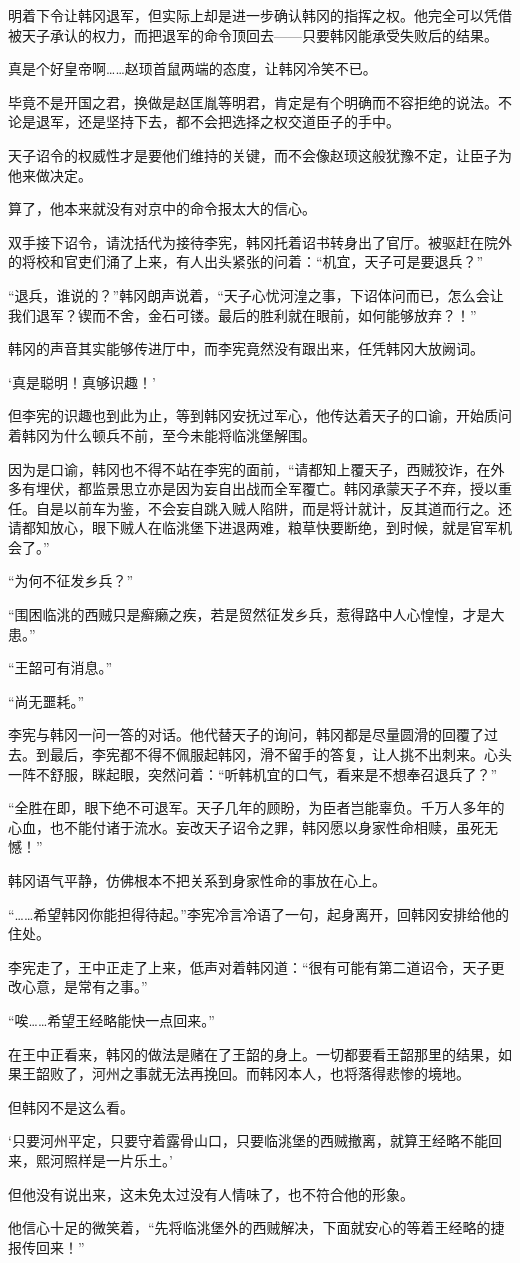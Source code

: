 明着下令让韩冈退军，但实际上却是进一步确认韩冈的指挥之权。他完全可以凭借被天子承认的权力，而把退军的命令顶回去——只要韩冈能承受失败后的结果。

真是个好皇帝啊……赵顼首鼠两端的态度，让韩冈冷笑不已。

毕竟不是开国之君，换做是赵匡胤等明君，肯定是有个明确而不容拒绝的说法。不论是退军，还是坚持下去，都不会把选择之权交道臣子的手中。

天子诏令的权威性才是要他们维持的关键，而不会像赵顼这般犹豫不定，让臣子为他来做决定。

算了，他本来就没有对京中的命令报太大的信心。

双手接下诏令，请沈括代为接待李宪，韩冈托着诏书转身出了官厅。被驱赶在院外的将校和官吏们涌了上来，有人出头紧张的问着：“机宜，天子可是要退兵？”

“退兵，谁说的？”韩冈朗声说着，“天子心忧河湟之事，下诏体问而已，怎么会让我们退军？锲而不舍，金石可镂。最后的胜利就在眼前，如何能够放弃？！”

韩冈的声音其实能够传进厅中，而李宪竟然没有跟出来，任凭韩冈大放阙词。

‘真是聪明！真够识趣！’

但李宪的识趣也到此为止，等到韩冈安抚过军心，他传达着天子的口谕，开始质问着韩冈为什么顿兵不前，至今未能将临洮堡解围。

因为是口谕，韩冈也不得不站在李宪的面前，“请都知上覆天子，西贼狡诈，在外多有埋伏，都监景思立亦是因为妄自出战而全军覆亡。韩冈承蒙天子不弃，授以重任。自是以前车为鉴，不会妄自跳入贼人陷阱，而是将计就计，反其道而行之。还请都知放心，眼下贼人在临洮堡下进退两难，粮草快要断绝，到时候，就是官军机会了。”

“为何不征发乡兵？”

“围困临洮的西贼只是癣癞之疾，若是贸然征发乡兵，惹得路中人心惶惶，才是大患。”

“王韶可有消息。”

“尚无噩耗。”

李宪与韩冈一问一答的对话。他代替天子的询问，韩冈都是尽量圆滑的回覆了过去。到最后，李宪都不得不佩服起韩冈，滑不留手的答复，让人挑不出刺来。心头一阵不舒服，眯起眼，突然问着：“听韩机宜的口气，看来是不想奉召退兵了？”

“全胜在即，眼下绝不可退军。天子几年的顾盼，为臣者岂能辜负。千万人多年的心血，也不能付诸于流水。妄改天子诏令之罪，韩冈愿以身家性命相赎，虽死无憾！”

韩冈语气平静，仿佛根本不把关系到身家性命的事放在心上。

“……希望韩冈你能担得待起。”李宪冷言冷语了一句，起身离开，回韩冈安排给他的住处。

李宪走了，王中正走了上来，低声对着韩冈道：“很有可能有第二道诏令，天子更改心意，是常有之事。”

“唉……希望王经略能快一点回来。”

在王中正看来，韩冈的做法是赌在了王韶的身上。一切都要看王韶那里的结果，如果王韶败了，河州之事就无法再挽回。而韩冈本人，也将落得悲惨的境地。

但韩冈不是这么看。

‘只要河州平定，只要守着露骨山口，只要临洮堡的西贼撤离，就算王经略不能回来，熙河照样是一片乐土。’

但他没有说出来，这未免太过没有人情味了，也不符合他的形象。

他信心十足的微笑着，“先将临洮堡外的西贼解决，下面就安心的等着王经略的捷报传回来！”

